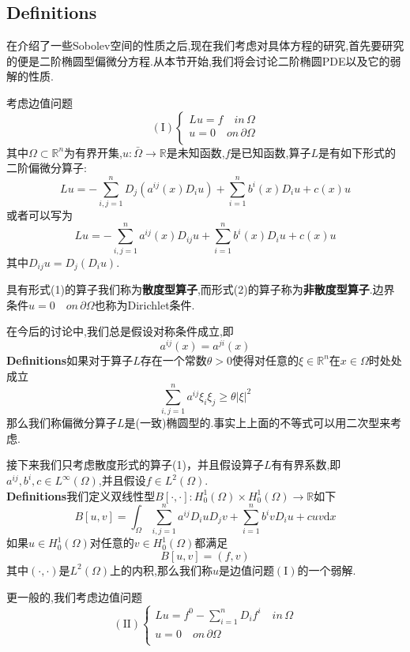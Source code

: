 \documentclass[a4paper,UTF8,12pt]{ctexart}
\begin{document}
\subsection{Definitions}
在介绍了一些Sobolev空间的性质之后,现在我们考虑对具体方程的研究,首先要研究的便是二阶椭圆型偏微分方程.从本节开始,我们将会讨论二阶椭圆PDE以及它的弱解的性质.\par
考虑边值问题
$$(\text{I})
\begin{cases}
    Lu= f\quad in \, \Omega\\
     u= 0\quad on \, \partial\Omega\\ 
\end{cases}
$$
其中$\Omega\subset \mathbb{R}^n$为有界开集,$u:\bar{\Omega}\to\mathbb{R}$是未知函数,$f$是已知函数,算子$L$是有如下形式的二阶偏微分算子:
\begin{equation}
    Lu = -\sum^n_{i,j=1}D_j(a^{ij}(x)D_iu)+\sum^n_{i=1}b^i(x)D_iu+c(x)u
\end{equation}
或者可以写为
\begin{equation}
    Lu = -\sum^n_{i,j=1}a^{ij}(x)D_{ij}u+\sum^n_{i=1}b^i(x)D_iu+c(x)u
\end{equation}
其中$D_{ij}u = D_j(D_iu)$.\par
具有形式(1)的算子我们称为\textbf{散度型算子},而形式(2)的算子称为\textbf{非散度型算子}.边界条件$u= 0\quad on \, \partial\Omega$也称为Dirichlet条件.\par
在今后的讨论中,我们总是假设对称条件成立,即
$$
a^{ij}(x) = a^{ji}(x)
$$
\textbf{Definitions}\quad 如果对于算子$L$存在一个常数$\theta >0$使得对任意的$\xi \in\mathbb{R}^n$在$x\in\Omega$时处处成立
$$
\sum^n_{i,j=1}a^{ij}\xi_i\xi_j\geqslant\theta |\xi|^2
$$
那么我们称偏微分算子$L$是(一致)椭圆型的.事实上上面的不等式可以用二次型来考虑.\par
接下来我们只考虑散度形式的算子(1)，并且假设算子$L$有有界系数,即$a^{ij},b^i,c\in L^{\infty}(\Omega)$,并且假设$f\in L^2(\Omega)$.\\
\textbf{Definitions}\quad 我们定义双线性型$B[\cdot,\cdot]:H^1_0(\Omega)\times H^1_0(\Omega)\to \mathbb{R}$如下
$$
B[u,v] = \int_\Omega \sum^n_{i,j=1}a^{ij}D_iu D_jv+\sum^n_{i=1}b^ivD_iu+cuv\mathrm{d}x
$$
如果$u\in H^1_0(\Omega)$对任意的$v\in H^1_0(\Omega)$都满足
\begin{equation}
    B[u,v] = (f,v)
\end{equation}
其中$(\cdot,\cdot)$是$L^2(\Omega)$上的内积,那么我们称$u$是边值问题$(\text{I})$的一个弱解.\par
更一般的,我们考虑边值问题
$$
(\text{II})
\begin{cases}
    Lu = f^0-\sum^n_{i=1}D_if^i\quad in \,\Omega\\
    u=0\quad on\, \partial\Omega\\
\end{cases}
$$
\end{document}

